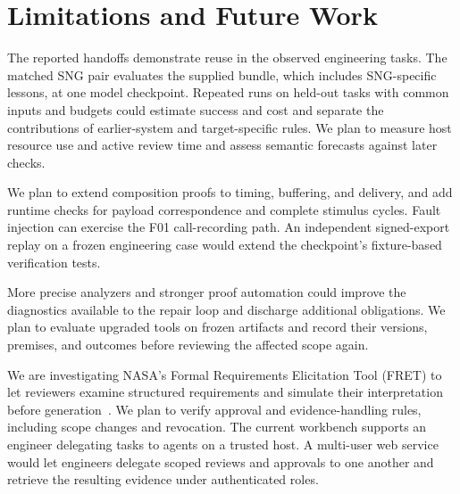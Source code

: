 \section{Limitations and Future Work}
\label{sec:limitations}
The reported handoffs demonstrate reuse in the observed engineering tasks. The matched SNG pair evaluates the supplied bundle, which includes SNG-specific lessons, at one model checkpoint. Repeated runs on held-out tasks with common inputs and budgets could estimate success and cost and separate the contributions of earlier-system and target-specific rules. We plan to measure host resource use and active review time and assess semantic forecasts against later checks.

We plan to extend composition proofs to timing, buffering, and delivery, and add runtime checks for payload correspondence and complete stimulus cycles. Fault injection can exercise the F01 call-recording path. An independent signed-export replay on a frozen engineering case would extend the checkpoint's fixture-based verification tests.

More precise analyzers and stronger proof automation could improve the diagnostics available to the repair loop and discharge additional obligations. We plan to evaluate upgraded tools on frozen artifacts and record their versions, premises, and outcomes before reviewing the affected scope again.

We are investigating NASA's Formal Requirements Elicitation Tool (FRET) to let reviewers examine structured requirements and simulate their interpretation before generation~\cite{nasaFret}. We plan to verify approval and evidence-handling rules, including scope changes and revocation. The current workbench supports an engineer delegating tasks to agents on a trusted host. A multi-user web service would let engineers delegate scoped reviews and approvals to one another and retrieve the resulting evidence under authenticated roles.
